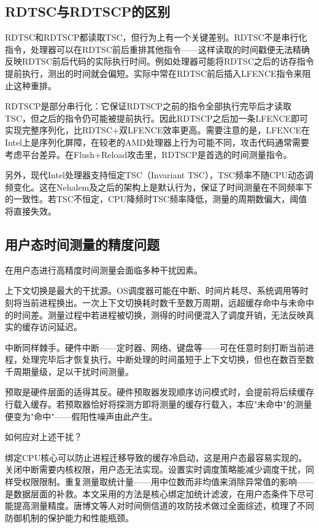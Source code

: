 \subsection{RDTSC与RDTSCP的区别}

RDTSC和RDTSCP都读取TSC，但行为上有一个关键差别。RDTSC不是串行化指令，处理器可以在RDTSC前后重排其他指令——这样读取的时间戳便无法精确反映RDTSC前后代码的实际执行时间。例如处理器可能将RDTSC之后的访存指令提前执行，测出的时间就会偏短。实际中常在RDTSC前后插入LFENCE指令来阻止这种重排。

RDTSCP是部分串行化：它保证RDTSCP之前的指令全部执行完毕后才读取TSC，但之后的指令仍可能被提前执行。因此RDTSCP之后加一条LFENCE即可实现完整序列化，比RDTSC+双LFENCE效率更高。需要注意的是，LFENCE在Intel上是序列化屏障，在较老的AMD处理器上行为可能不同，攻击代码通常需要考虑平台差异。在Flush+Reload攻击里，RDTSCP是首选的时间测量指令。

另外，现代Intel处理器支持恒定TSC（Invariant TSC），TSC频率不随CPU动态调频变化。这在Nehalem及之后的架构上是默认行为，保证了时间测量在不同频率下的一致性。若TSC不恒定，CPU降频时TSC频率降低，测量的周期数偏大，阈值将直接失效。

\subsection{用户态时间测量的精度问题}

在用户态进行高精度时间测量会面临多种干扰因素。

上下文切换是最大的干扰源。OS调度器可能在中断、时间片耗尽、系统调用等时刻将当前进程换出。一次上下文切换耗时数千至数万周期，远超缓存命中与未命中的时间差。测量过程中若进程被切换，测得的时间便混入了调度开销，无法反映真实的缓存访问延迟。

中断同样棘手。硬件中断——定时器、网络、键盘等——可在任意时刻打断当前进程，处理完毕后才恢复执行。中断处理的时间虽短于上下文切换，但也在数百至数千周期量级，足以干扰时间测量。

预取是硬件层面的适得其反。硬件预取器发现顺序访问模式时，会提前将后续缓存行载入缓存。若预取器恰好将探测方即将测量的缓存行载入，本应"未命中"的测量便变为"命中"——假阳性噪声由此产生。

如何应对上述干扰？

绑定CPU核心可以防止进程迁移导致的缓存冷启动，这是用户态最容易实现的。关闭中断需要内核权限，用户态无法实现。设置实时调度策略能减少调度干扰，同样受权限限制。重复测量取统计量——用中位数而非均值来消除异常值的影响——是数据层面的补救。本文采用的方法是核心绑定加统计滤波，在用户态条件下尽可能提高测量精度。唐博文等人对时间侧信道的攻防技术做过全面综述，梳理了不同防御机制的保护能力和性能瓶颈。

